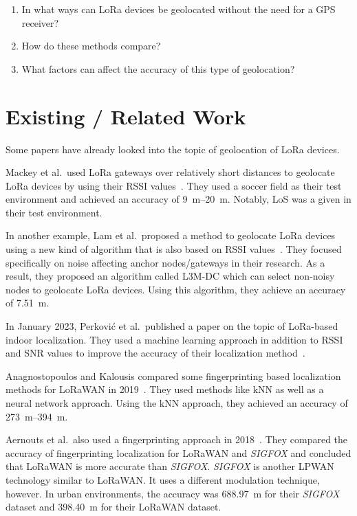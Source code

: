 
\begin{enumerate}
      \item In what ways can \ac{LoRa} devices be geolocated without the need for a \ac{GPS} receiver?
      \item How do these methods compare?
      \item What factors can affect the accuracy of this type of geolocation?
\end{enumerate}

\section{Existing / Related Work}

Some papers have already looked into the topic of geolocation of \ac{LoRa} devices.

Mackey et al.~used \ac{LoRa} gateways over relatively short distances to geolocate \ac{LoRa} devices by using their \ac{RSSI} values~\cite{mackey_lora-based_2019}.
They used a soccer field as their test environment and achieved an accuracy of \SIrange{9}{20}{\meter}.
Notably, \ac{LoS} was a given in their test environment.

In another example, Lam et al.~proposed a method to geolocate \ac{LoRa} devices using a new kind of algorithm that is also based on \ac{RSSI} values~\cite{lam_new_2018}.
They focused specifically on noise affecting anchor nodes/gateways in their research.
As a result, they proposed an algorithm called \acf{L3M-DC} which can select non-noisy nodes to geolocate \ac{LoRa} devices.
Using this algorithm, they achieve an accuracy of \SI{7.51}{\meter}.

In January 2023, Perković et al.\ published a paper on the topic of \ac{LoRa}-based indoor localization.
They used a machine learning approach in addition to \ac{RSSI} and \ac{SNR} values to improve the accuracy of their localization method~\cite{perkovic_machine_2023}.

Anagnostopoulos and Kalousis compared some fingerprinting based localization methods for \ac{LoRaWAN} in 2019~\cite{anagnostopoulos_reproducible_2019}.
They used methods like \ac{kNN} as well as a neural network approach.
Using the \ac{kNN} approach, they achieved an accuracy of \SIrange{273}{394}{\meter}.

Aernouts et al.\ also used a fingerprinting approach in 2018~\cite{aernouts_sigfox_2018}.
They compared the accuracy of fingerprinting localization for \ac{LoRaWAN} and \emph{SIGFOX} and concluded that \ac{LoRaWAN} is more accurate than \emph{SIGFOX}.
\emph{SIGFOX} is another \ac{LPWAN} technology similar to \ac{LoRaWAN}.
It uses a different modulation technique, however.
In urban environments, the accuracy was \SI{688.97}{\meter} for their \emph{SIGFOX} dataset and \SI{398.40}{\meter} for their LoRaWAN dataset.

